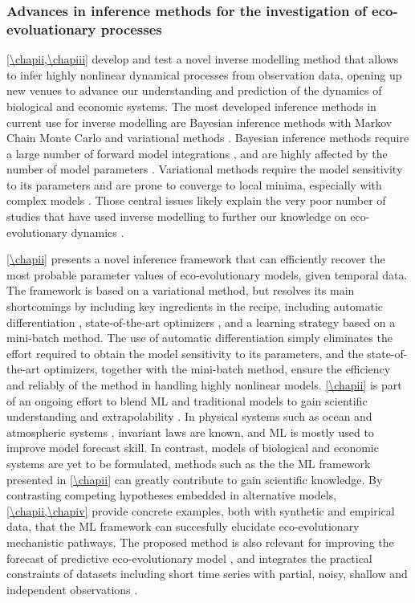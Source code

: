 \subsubsection{Advances in inference methods for the investigation of eco-evoluationary processes}

\cref{\chapii,\chapiii} develop and test a novel inverse modelling method that allows to infer highly nonlinear dynamical processes from observation data, opening up new venues to advance our understanding and prediction of the dynamics of biological and economic systems.
% 
The most developed inference methods in current use for inverse modelling are Bayesian inference methods with Markov Chain Monte Carlo \xxx and variational methods \xxx.
% 
% 
Bayesian inference methods require a large number of forward model integrations \citep{Schneider2017}, and are highly affected by the number of model parameters \citep{Csillery2010}.
% 
Variational methods require the model sensitivity to its parameters \xxx and are prone to converge to local minima, especially with complex models \citep{XXX}.
% 
Those central issues likely explain the very poor number of studies that have used inverse modelling to further our knowledge on eco-evolutionary dynamics \xxx. 
% 

%
\cref{\chapii} presents a novel inference framework that can efficiently recover the most probable parameter values of eco-evolutionary models, given temporal data.
% 
The framework is based on a variational method, but resolves its main shortcomings by including key ingredients in the recipe, including automatic differentiation \citep{Rackauckas2020a}, state-of-the-art optimizers \citep{Kingma2014}, and a learning strategy based on a mini-batch method. 
% 
The use of automatic differentiation simply eliminates the effort required to obtain the model sensitivity to its parameters, and the state-of-the-art optimizers, together with the mini-batch method, ensure the efficiency and reliably of the method in handling highly nonlinear models.
% 
\cref{\chapii} is part of an ongoing effort to blend ML and traditional models to gain scientific understanding and extrapolability \citep{XXX}. 
% 
In physical systems such as ocean and atmospheric systems \xxx, invariant laws are known, and ML is mostly used to improve model forecast skill. In contrast, models of biological and economic systems are yet to be formulated, methods such as the the ML framework presented in \cref{\chapii}  can greatly contribute to gain scientific knowledge. 
% 
By contrasting competing hypotheses embedded in alternative models, \cref{\chapii,\chapiv} provide concrete examples, both with synthetic and empirical data, that the ML framework can succesfully elucidate eco-evolutionary mechanistic pathways.
The proposed method is also relevant for improving the forecast of predictive eco-evolutionary model \cite{Urban2016}, and integrates the practical constraints of datasets including short time series with partial, noisy, shallow and independent observations \citep{Dornelas2018}.

